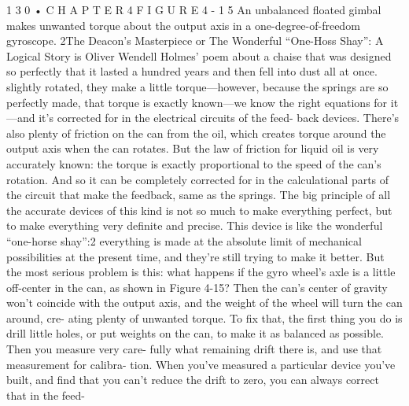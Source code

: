\documentclass[10pt,oneside]{article}
\begin{document}
1 3 0 • C H A P T E R  4 F I G U R E  4 - 1 5 An unbalanced floated gimbal makes unwanted torque about the output axis in a one-degree-of-freedom gyroscope. 2The Deacon’s Masterpiece or The Wonderful “One-Hoss Shay”: A Logical Story is Oliver Wendell Holmes’ poem about a chaise that was designed so perfectly that it lasted a hundred years and then fell into dust all at once. slightly rotated, they make a little torque---however, because the springs are so perfectly made, that torque is exactly known---we know the right equations for it---and it’s corrected for in the electrical circuits of the feed- back devices. There’s also plenty of friction on the can from the oil, which creates torque around the output axis when the can rotates. But the law of friction for liquid oil is very accurately known: the torque is exactly proportional to the speed of the can’s rotation. And so it can be completely corrected for in the calculational parts of the circuit that make the feedback, same as the springs. The big principle of all the accurate devices of this kind is not so much to make everything perfect, but to make everything very definite and precise. This device is like the wonderful “one-horse shay”:2 everything is made at the absolute limit of mechanical possibilities at the present time, and they’re still trying to make it better. But the most serious problem is this: what happens if the gyro wheel’s axle is a little off-center in the can, as shown in Figure 4-15? Then the can’s center of gravity won’t coincide with the output axis, and the weight of the wheel will turn the can around, cre- ating plenty of unwanted torque. To fix that, the first thing you do is drill little holes, or put weights on the can, to make it as balanced as possible. Then you measure very care- fully what remaining drift there is, and use that measurement for calibra- tion. When you’ve measured a particular device you’ve built, and find that you can’t reduce the drift to zero, you can always correct that in the feed-\par
\end{document}
